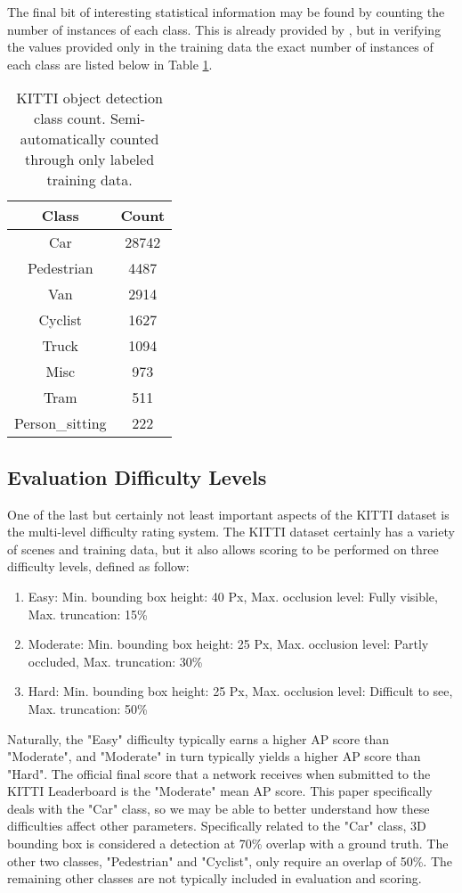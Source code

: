The final bit of interesting statistical information may be found by counting the number of instances of each class. This is already provided by \cite{geiger_are_2012}, but in verifying the values provided only in the training data the exact number of instances of each class are listed below in Table \ref{kitti_class_stats}. 

\begin{table}[h]
	\centering
	\caption{KITTI object detection class count. Semi-automatically counted through only labeled training data.}
	\begin{tabular}{|c|c|}
		\hline
		\bfseries Class & \bfseries Count\\
		\hline
		Car & 28742 \\
		\hline
		Pedestrian & 4487 \\
		\hline
		Van & 2914 \\
		\hline
		Cyclist & 1627 \\
		\hline
		Truck & 1094 \\
		\hline
		Misc & 973 \\
		\hline
		Tram & 511 \\
		\hline
		Person\_sitting & 222 \\
		\hline
	\end{tabular}
	\label{kitti_class_stats}
\end{table}

\subsection{Evaluation Difficulty Levels}
One of the last but certainly not least important aspects of the KITTI dataset is the multi-level difficulty rating system. The KITTI dataset certainly has a variety of scenes and training data, but it also allows scoring to be performed on three difficulty levels, defined as follow: 

\begin{enumerate}\itemsep=-0.5em
	\item Easy: Min. bounding box height: 40 Px, Max. occlusion level: Fully visible, Max. truncation: 15\%
	\item Moderate: Min. bounding box height: 25 Px, Max. occlusion level: Partly occluded, Max. truncation: 30\%
	\item Hard: Min. bounding box height: 25 Px, Max. occlusion level: Difficult to see, Max. truncation: 50\%
\end{enumerate}

Naturally, the "Easy" difficulty typically earns a higher AP score than "Moderate", and "Moderate" in turn typically yields a higher AP score than "Hard". The official final score that a network receives when submitted to the KITTI Leaderboard is the "Moderate" mean AP score. This paper specifically deals with the "Car" class, so we may be able to better understand how these difficulties affect other parameters. Specifically related to the "Car" class, 3D bounding box is considered a detection at 70\% overlap with a ground truth. The other two classes, "Pedestrian" and "Cyclist", only require an overlap of 50\%. The remaining other classes are not typically included in evaluation and scoring. 

